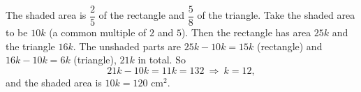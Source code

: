 The shaded area is $\dfrac{2}{5}$ of the rectangle and $\dfrac{5}{8}$ of the triangle. Take the shaded area to be $10k$ (a common multiple of $2$ and $5$). Then the rectangle has area $25k$ and the triangle $16k$. The unshaded parts are $25k-10k=15k$ (rectangle) and $16k-10k=6k$ (triangle), $21k$ in total. So
\[
21k-10k=11k=132\ \Longrightarrow\ k=12,
\]
and the shaded area is $10k=\boxed{120\text{ cm}^2}$.
